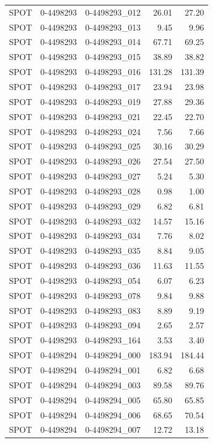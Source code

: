 \begin{tabular}{lllrr}
SPOT & 0-4498293 & 0-4498293_012 & 26.01 & 27.20 \\
SPOT & 0-4498293 & 0-4498293_013 & 9.45 & 9.96 \\
SPOT & 0-4498293 & 0-4498293_014 & 67.71 & 69.25 \\
SPOT & 0-4498293 & 0-4498293_015 & 38.89 & 38.82 \\
SPOT & 0-4498293 & 0-4498293_016 & 131.28 & 131.39 \\
SPOT & 0-4498293 & 0-4498293_017 & 23.94 & 23.98 \\
SPOT & 0-4498293 & 0-4498293_019 & 27.88 & 29.36 \\
SPOT & 0-4498293 & 0-4498293_021 & 22.45 & 22.70 \\
SPOT & 0-4498293 & 0-4498293_024 & 7.56 & 7.66 \\
SPOT & 0-4498293 & 0-4498293_025 & 30.16 & 30.29 \\
SPOT & 0-4498293 & 0-4498293_026 & 27.54 & 27.50 \\
SPOT & 0-4498293 & 0-4498293_027 & 5.24 & 5.30 \\
SPOT & 0-4498293 & 0-4498293_028 & 0.98 & 1.00 \\
SPOT & 0-4498293 & 0-4498293_029 & 6.82 & 6.81 \\
SPOT & 0-4498293 & 0-4498293_032 & 14.57 & 15.16 \\
SPOT & 0-4498293 & 0-4498293_034 & 7.76 & 8.02 \\
SPOT & 0-4498293 & 0-4498293_035 & 8.84 & 9.05 \\
SPOT & 0-4498293 & 0-4498293_036 & 11.63 & 11.55 \\
SPOT & 0-4498293 & 0-4498293_054 & 6.07 & 6.23 \\
SPOT & 0-4498293 & 0-4498293_078 & 9.84 & 9.88 \\
SPOT & 0-4498293 & 0-4498293_083 & 8.89 & 9.19 \\
SPOT & 0-4498293 & 0-4498293_094 & 2.65 & 2.57 \\
SPOT & 0-4498293 & 0-4498293_164 & 3.53 & 3.40 \\
SPOT & 0-4498294 & 0-4498294_000 & 183.94 & 184.44 \\
SPOT & 0-4498294 & 0-4498294_001 & 6.82 & 6.68 \\
SPOT & 0-4498294 & 0-4498294_003 & 89.58 & 89.76 \\
SPOT & 0-4498294 & 0-4498294_005 & 65.80 & 65.85 \\
SPOT & 0-4498294 & 0-4498294_006 & 68.65 & 70.54 \\
SPOT & 0-4498294 & 0-4498294_007 & 12.72 & 13.18 \\

\end{tabular}
